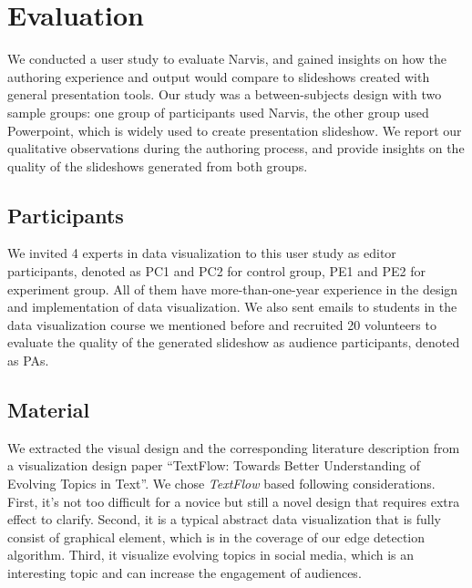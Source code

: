 \section{Evaluation}
We conducted a user study to evaluate Narvis, and gained insights on how the authoring experience and output would compare to slideshows created with general presentation tools. Our study was a between-subjects design with two sample groups: one group of participants used Narvis, the other group used Powerpoint, which is widely used to create presentation slideshow. 
We report our qualitative observations during the authoring process, and provide insights on the quality of the slideshows generated from both groups.
\subsection{Participants}
We invited 4 experts in data visualization to this user study as editor participants, denoted as PC1 and PC2 for control group, PE1 and PE2 for experiment group. All of them have more-than-one-year experience in the design and implementation of data visualization. We also sent emails to students in the data visualization course we mentioned before and recruited 20 volunteers to evaluate the quality of the generated slideshow as audience participants, denoted as PAs. 
\subsection{Material}
We extracted the visual design and the corresponding literature description from  a visualization design paper ``TextFlow: Towards Better Understanding of Evolving Topics in Text''\cite{cui_textflow:_2011}.
We chose \textit{TextFlow} based following considerations. First, it's not too difficult for a novice but still a novel design that requires extra effect to clarify.
Second, it is a typical abstract data visualization that is fully consist of graphical element, which is in the coverage of our edge detection algorithm. 
Third, it visualize evolving topics in social media, which is an interesting topic and can increase the engagement of audiences. 

